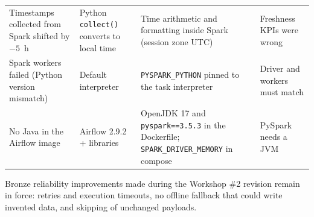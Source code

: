 \documentclass[11pt,a4paper]{article}
\begin{document}
\begin{longtable}{p{4.1cm}p{3.0cm}p{4.6cm}p{3.4cm}}
Timestamps collected from Spark shifted by $-5$~h & Python \texttt{collect(\allowbreak{})} converts to local time & Time arithmetic and formatting inside Spark (session zone UTC) & Freshness KPIs were wrong\\
Spark workers failed (Python version mismatch) & Default interpreter & \texttt{PYSPARK\_\allowbreak{}PYTHON} pinned to the task interpreter & Driver and workers must match\\
No Java in the Airflow image & Airflow 2.9.2 + libraries & OpenJDK 17 and \texttt{pyspark==3.\allowbreak{}5.\allowbreak{}3} in the Dockerfile; \texttt{SPARK\_\allowbreak{}DRIVER\_\allowbreak{}MEMORY} in compose & PySpark needs a JVM\\
\bottomrule
\end{longtable}
Bronze reliability improvements made during the Workshop \#2 revision remain in force: retries and execution timeouts,
no offline fallback that could write invented data, and skipping of unchanged payloads.
\end{document}
